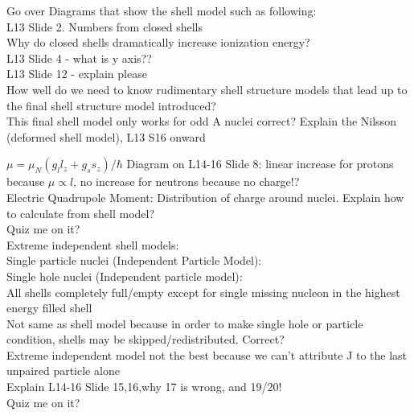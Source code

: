 \documentclass{article}
\begin{document}
\begin{multicols}{3}
Go over Diagrams that show the shell model such as following:\\
\hspace*{0.01\textwidth} L13 Slide 2.  Numbers from closed shells\\
\hspace*{0.01\textwidth} Why do closed shells dramatically increase ionization energy?\\
\hspace*{0.01\textwidth} L13 Slide 4 - what is y axis?? \\
\hspace*{0.01\textwidth} L13 Slide 12 - explain please\\
\hspace*{0.01\textwidth} How well do we need to know rudimentary shell structure models that lead up to the final shell structure model introduced?\\
\hspace*{0.01\textwidth} This final shell model only works for odd A nuclei correct?
\hspace*{0.01\textwidth} Explain the Nilsson (deformed shell model), L13 S16 onward\

$\mu = \mu_{N}(g_{l}l_{z} + g_{s}s_{z}) / \hbar$
Diagram on L14-16 Slide 8: linear increase for protons because $\mu \propto l$, no increase for neutrons because no charge!?\\
Electric Quadrupole Moment: Distribution of charge around nuclei.  Explain how to calculate from shell model?\\

Quiz me on it?\\

Extreme independent shell models:\\
Single particle nuclei (Independent Particle Model):\\
\hspace*{0.01\textwidth} 
Single hole nuclei (Independent particle model):\\
\hspace*{0.01\textwidth} All shells completely full/empty except for single missing nucleon in the highest energy filled shell\\
\hspace*{0.01\textwidth} Not same as shell model because in order to make single hole or particle condition, shells may be skipped/redistributed.  Correct?\\
Extreme independent model not the best because we can't attribute J to the last unpaired particle alone\\
Explain L14-16 Slide 15,16,why 17 is wrong, and 19/20!\\
Quiz me on it?


\end{multicols}
\end{document}
